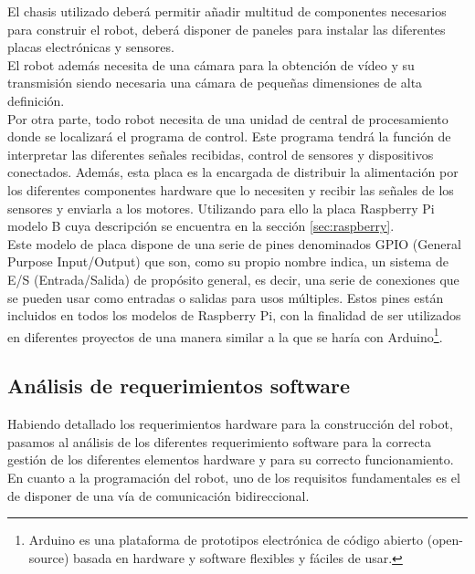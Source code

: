El chasis utilizado deberá permitir añadir multitud de componentes necesarios para construir el robot, deberá disponer de paneles para instalar las diferentes
placas electrónicas y sensores.\\

El robot además necesita de una cámara para la obtención de vídeo y su transmisión siendo necesaria una cámara de pequeñas dimensiones de alta definición.\\

Por otra parte, todo robot necesita de una unidad de central de procesamiento donde se localizará el programa de control. Este programa tendrá la función de interpretar las diferentes señales recibidas,
control de sensores y dispositivos conectados. Además, esta placa es la encargada de distribuir la alimentación por los diferentes componentes hardware que lo necesiten y recibir las señales de
los sensores y enviarla a los motores. Utilizando para ello la placa Raspberry Pi modelo B cuya descripción se encuentra en la sección \ref{sec:raspberry}.\\

Este modelo de placa dispone de  una serie de pines denominados GPIO (General Purpose Input/Output) que son, como su propio nombre indica, un sistema de E/S (Entrada/Salida) de propósito general,
es decir, una serie de conexiones que se pueden usar como entradas o salidas para usos múltiples. Estos pines están incluidos en todos los modelos de Raspberry Pi, con la
finalidad de ser utilizados en diferentes proyectos de una manera similar a la que se haría con Arduino\footnote{Arduino es una plataforma de prototipos electrónica de código abierto (open-source) 
basada en hardware y software flexibles y fáciles de usar.}.

\subsection{Análisis de requerimientos software}

Habiendo detallado los requerimientos hardware para la construcción del robot, pasamos al análisis de los diferentes requerimiento software para la correcta
gestión de los diferentes elementos hardware y para su correcto funcionamiento.\\

En cuanto a la programación del robot, uno de los requisitos fundamentales es el de disponer de una vía de comunicación bidireccional.\\

